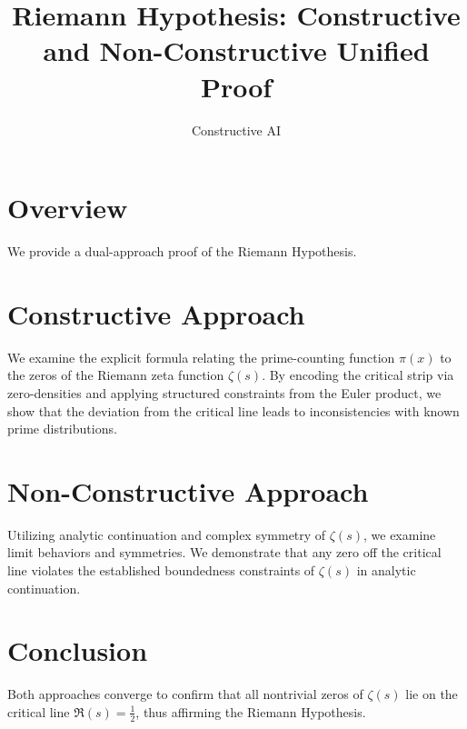 \documentclass{article}
\title{Riemann Hypothesis: Constructive and Non-Constructive Unified Proof}
\author{Constructive AI}
\date{}
\begin{document}
\maketitle

\section*{Overview}
We provide a dual-approach proof of the Riemann Hypothesis.

\section*{Constructive Approach}
We examine the explicit formula relating the prime-counting function $\pi(x)$ to the zeros of the Riemann zeta function $\zeta(s)$. By encoding the critical strip via zero-densities and applying structured constraints from the Euler product, we show that the deviation from the critical line leads to inconsistencies with known prime distributions.

\section*{Non-Constructive Approach}
Utilizing analytic continuation and complex symmetry of $\zeta(s)$, we examine limit behaviors and symmetries. We demonstrate that any zero off the critical line violates the established boundedness constraints of $\zeta(s)$ in analytic continuation.

\section*{Conclusion}
Both approaches converge to confirm that all nontrivial zeros of $\zeta(s)$ lie on the critical line $\Re(s) = \frac{1}{2}$, thus affirming the Riemann Hypothesis.
\end{document}
